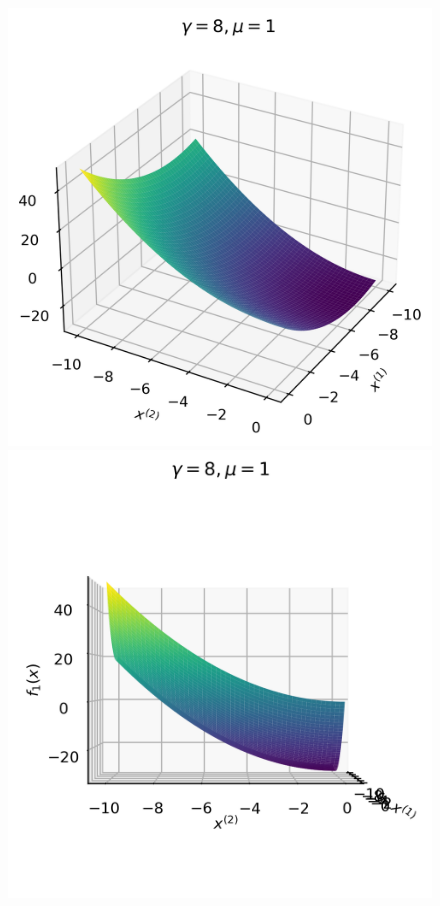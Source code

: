 \documentclass[a4paper, 14pt, dvipdfmx]{extarticle}
\begin{document}
\begin{figure}[H]
    \begin{minipage}{0.49\columnwidth}
        \centering
        \includegraphics[width=0.6\columnwidth]{fk_1_1.png}
    \end{minipage}
    \begin{minipage}{0.49\columnwidth}
        \centering
        \includegraphics[width=0.6\columnwidth]{fk_1_2.png}
    \end{minipage}
\end{figure}
\end{document}

